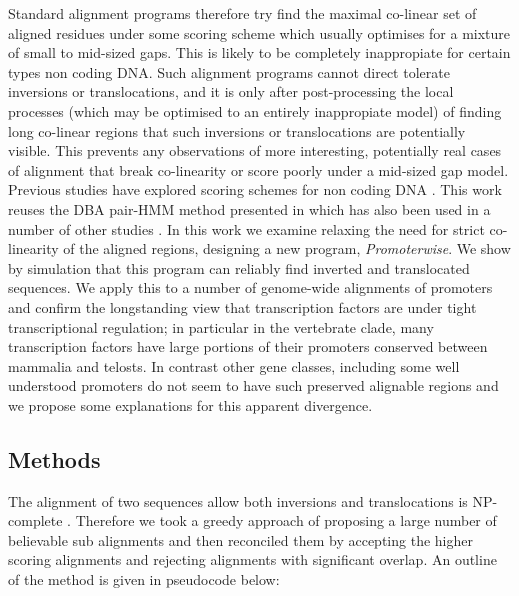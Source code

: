 \documentclass{article} \usepackage{a4}
\begin{document}
Standard alignment programs therefore try find the maximal co-linear
set of aligned residues under some scoring scheme which usually
optimises for a mixture of small to mid-sized gaps. This is likely to
be completely inappropiate for certain types non coding DNA. Such
alignment programs cannot direct tolerate inversions or
translocations, and it is only after post-processing the local
processes (which may be optimised to an entirely inappropiate model)
of finding long co-linear regions that such inversions or
translocations are potentially visible. This prevents any observations
of more interesting, potentially real cases of alignment that break
co-linearity or score poorly under a mid-sized gap model. Previous
studies have explored scoring schemes for non coding DNA
. This work reuses the DBA pair-HMM
method presented in  which has also been used in a
number of other studies . In this work
we examine relaxing the need for strict co-linearity of the aligned
regions, designing a new program, \emph{Promoterwise}. We show by
simulation that this program can reliably find inverted and
translocated sequences. We apply this to a number of genome-wide
alignments of promoters and confirm the longstanding view that
transcription factors are under tight transcriptional regulation; in
particular in the vertebrate clade, many transcription factors have
large portions of their promoters conserved between mammalia and
telosts. In contrast other gene classes, including some well
understood promoters do not seem to have such preserved alignable
regions and we propose some explanations for this apparent divergence.


\subsection{Methods}

The alignment of two sequences allow both inversions and translocations
is NP-complete . Therefore we took a greedy approach
of proposing a large number of believable sub alignments and then reconciled
them by accepting the higher scoring alignments and rejecting alignments
with significant overlap. An outline of the method is given in pseudocode
below:
\end{document}
